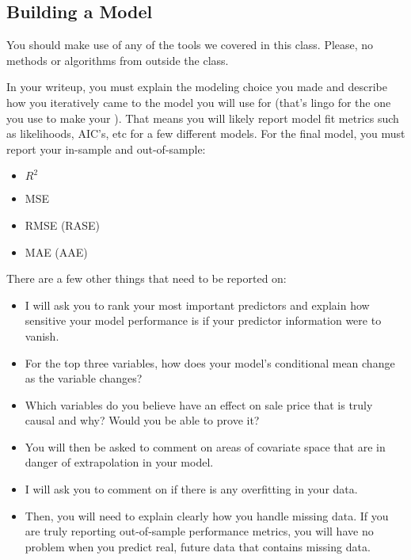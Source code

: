 \documentclass[12pt]{article}
\begin{document}
\subsection{Building a Model}

You should make use of any of the tools we covered in this class. Please, no methods or algorithms from outside the class.

In your writeup, you must explain the modeling choice you made and describe how you iteratively came to the model you will use for  (that's lingo for the one you use to make your ). That means you will likely report model fit metrics such as likelihoods, AIC's, etc for a few different models. For the final model, you must report your in-sample and out-of-sample: 

\begin{itemize}
\item $R^2$ 
\item MSE 
\item RMSE (RASE)
\item MAE (AAE)
\end{itemize}

There are a few other things that need to be reported on:


\begin{itemize}
\item I will ask you to rank your most important predictors and explain how sensitive your model performance is if your predictor information were to vanish.

\item For the top three variables, how does your model's conditional mean change as the variable changes?

\item Which variables do you believe have an effect on sale price that is truly causal and why? Would you be able to prove it?

\item You will then be asked to comment on areas of covariate space that are in danger of extrapolation in your model.

\item I will ask you to comment on if there is any overfitting in your data.

\item Then, you will need to explain clearly how you handle missing data. If you are truly reporting out-of-sample performance metrics, you will have no problem when you predict real, future data that contains missing data.
\end{itemize}
\end{document}
